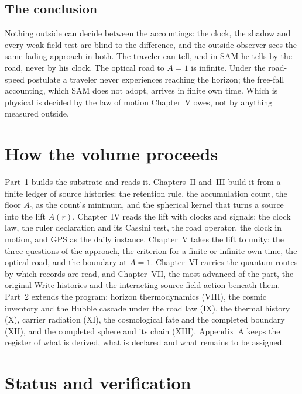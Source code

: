 \subsection{The conclusion}

Nothing outside can decide between the accountings: the clock, the shadow and every weak-field test are blind to the difference, and the outside observer sees the same fading approach in both. The traveler can tell, and in SAM he tells by the road, never by his clock. The optical road to $A=1$ is infinite. Under the road-speed postulate a traveler never experiences reaching the horizon; the free-fall accounting, which SAM does not adopt, arrives in finite own time. Which is physical is decided by the law of motion Chapter~V owes, not by anything measured outside.

\section{How the volume proceeds}
\label{sec:c1-map}

Part~1 builds the substrate and reads it. Chapters~II and~III build it from a finite ledger of source histories: the retention rule, the accumulation count, the floor $A_0$ as the count's minimum, and the spherical kernel that turns a source into the lift $A(r)$. Chapter~IV reads the lift with clocks and signals: the clock law, the ruler declaration and its Cassini test, the road operator, the clock in motion, and GPS as the daily instance. Chapter~V takes the lift to unity: the three questions of the approach, the criterion for a finite or infinite own time, the optical road, and the boundary at $A=1$. Chapter~VI carries the quantum routes by which records are read, and Chapter~VII, the most advanced of the part, the original Write histories and the interacting source-field action beneath them. Part~2 extends the program: horizon thermodynamics (VIII), the cosmic inventory and the Hubble cascade under the road law (IX), the thermal history (X), carrier radiation (XI), the cosmological fate and the completed boundary (XII), and the completed sphere and its chain (XIII). Appendix~A keeps the register of what is derived, what is declared and what remains to be assigned.

\section{Status and verification}
\label{sec:c1-status}

